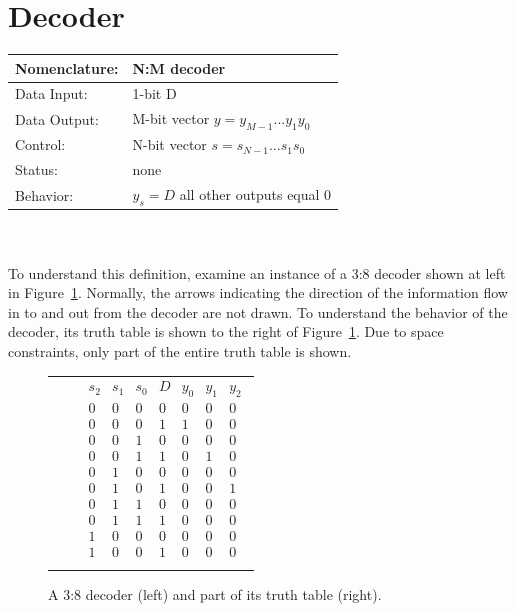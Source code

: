 \section{Decoder}
\begin{tabular}{|l|p{3.5in}|} \hline
Nomenclature:  & N:M decoder				\\ \hline
Data Input:    & 1-bit D		\\ \hline
Data Output:   & M-bit vector $y = y_{M-1} \ldots y_1 y_0$	\\ \hline
Control:       & N-bit vector $s = s_{N-1} \ldots s_1 s_0$	\\ \hline
Status:        & none					\\ \hline
Behavior:      & $y_s = D$ all other outputs equal 0	\\ \hline
\end{tabular}
\label{page:dec}
\\ \\
To understand this definition, examine an
instance of a 3:8 decoder shown at left in Figure~\ref{fig:3:8}.
Normally, the arrows indicating the direction of the information 
flow in to and out from the decoder are not drawn.  
To understand the behavior of the decoder, its
truth table is shown to the right of Figure~\ref{fig:3:8}. 
Due to space constraints, only part of the entire truth
table is shown.

\begin{figure}[ht]
\begin{tabular}[b]{p{1.0in}p{0.5in}l}
\includegraphics[0mm,20mm][12mm,12mm]{./Fig4/3:8.eps} & &
$\begin{array}{c|c|c|c||c|c|c}
s_2 & s_1 & s_0 & D & y_0 & y_1 & y_2\\ \hline
0 & 0 & 0 & 0 	& 0  &   0 &   0\\ \hline
0 & 0 & 0 & 1 	& 1  &   0 &   0\\ \hline
0 & 0 & 1 & 0 	& 0  &   0 &   0\\ \hline
0 & 0 & 1 & 1 	& 0  &   1 &   0\\ \hline
0 & 1 & 0 & 0 	& 0  &   0 &   0\\ \hline
0 & 1 & 0 & 1 	& 0  &   0 &   1\\ \hline
0 & 1 & 1 & 0 	& 0  &   0 &   0\\ \hline
0 & 1 & 1 & 1 	& 0  &   0 &   0\\ \hline
1 & 0 & 0 & 0 	& 0  &   0 &   0\\ \hline
1 & 0 & 0 & 1 	& 0  &   0 &   0\\
\end{array}$ \\
\end{tabular}
\caption{A 3:8 decoder (left) and part of its truth table (right).}
\label{fig:3:8}
\end{figure}

